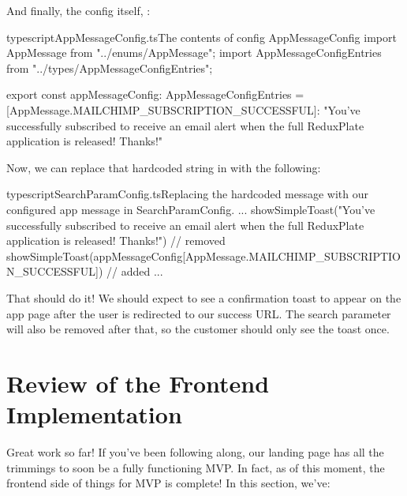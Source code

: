 \documentclass[a4paper,headinclude=on,footinclude=on,12pt,oneside]{scrbook}
\begin{document}
And finally, the config itself, :

\begin{codeInput}{typescript}{AppMessageConfig.ts}{The contents of config AppMessageConfig}
import AppMessage from "../enums/AppMessage";
import { AppMessageConfigEntries } from "../types/AppMessageConfigEntries";

export const appMessageConfig: AppMessageConfigEntries = {
    [AppMessage.MAILCHIMP_SUBSCRIPTION_SUCCESSFUL]: "You've successfully subscribed to receive an email alert when the full ReduxPlate application is released! Thanks!"
}
\end{codeInput}

Now, we can replace that hardcoded string in  with the following:

\begin{codeInput}{typescript}{SearchParamConfig.ts}{Replacing the hardcoded message with our configured app message in SearchParamConfig.}
...
showSimpleToast("You've successfully subscribed to receive an email alert when the full ReduxPlate application is released! Thanks!") // removed
showSimpleToast(appMessageConfig[AppMessage.MAILCHIMP\_SUBSCRIPTION\_SUCCESSFUL]) // added
...
\end{codeInput}

That should do it! We should expect to see a confirmation toast to appear on the app page after the user is redirected to our success URL. The search parameter will also be removed after that, so the customer should only see the toast once.


\begin{arrows}
  \item 
\end{arrows}

\section{Review of the Frontend Implementation}

Great work so far! If you've been following along, our landing page has all the trimmings to soon be a fully functioning MVP. In fact, as of this moment, the frontend side of things for MVP is complete! In this section, we've: 
\end{document}
